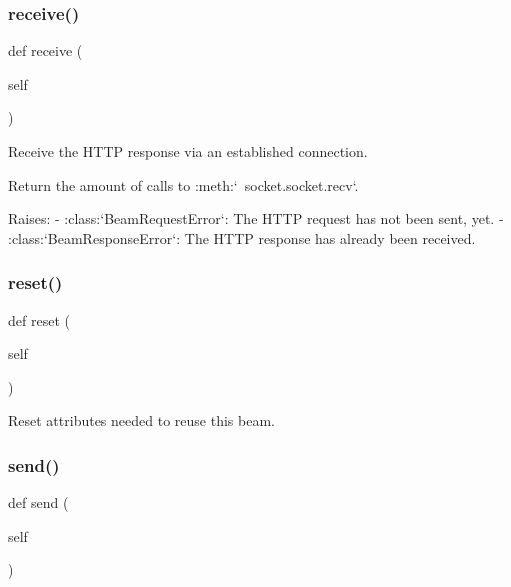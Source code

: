 \subsubsection{\texorpdfstring{receive()}{receive()}}
{\footnotesize\ttfamily def receive (\begin{DoxyParamCaption}\item[{}]{self }\end{DoxyParamCaption})}

\begin{DoxyVerb}Receive the HTTP response via an established connection.

Return the amount of calls to :meth:`~socket.socket.recv`.

Raises:
    - :class:`BeamRequestError`: The HTTP request has not been
      sent, yet.
    - :class:`BeamResponseError`: The HTTP response has already
      been received.
\end{DoxyVerb}
 \mbox{\label{classpewpewlaz0rt4nk_1_1_beam_a51829b63adb24ac48d350dee60181002}} 
\subsubsection{\texorpdfstring{reset()}{reset()}}
{\footnotesize\ttfamily def reset (\begin{DoxyParamCaption}\item[{}]{self }\end{DoxyParamCaption})}

\begin{DoxyVerb}Reset attributes needed to reuse this beam.\end{DoxyVerb}
 \mbox{\label{classpewpewlaz0rt4nk_1_1_beam_a0fbdc6c4c08e0f205d671ea3cb6fffdd}} 
\subsubsection{\texorpdfstring{send()}{send()}}
{\footnotesize\ttfamily def send (\begin{DoxyParamCaption}\item[{}]{self }\end{DoxyParamCaption})}

